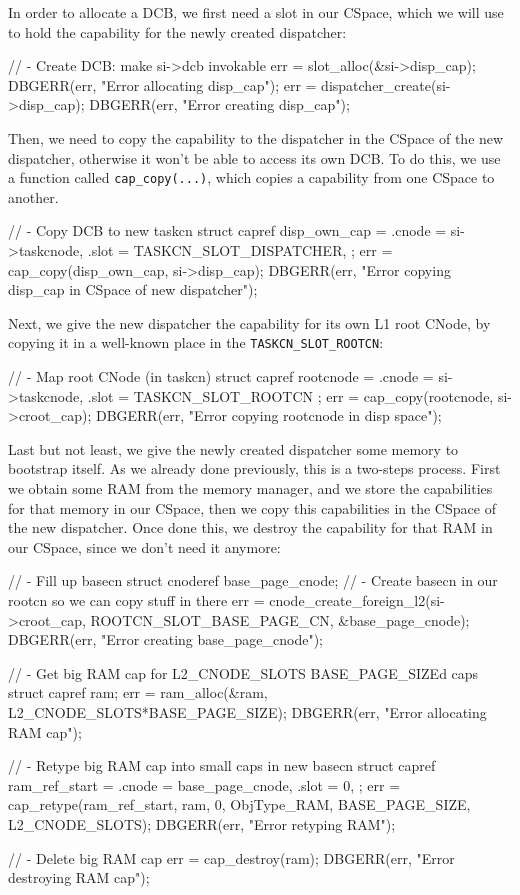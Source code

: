 \documentclass[a4paper,twoside,openright]{report}
\begin{document}
In order to allocate a DCB, we first need a slot in our CSpace, which we will use to hold the capability for the newly created dispatcher:
\begin{pandacode}
    // - Create DCB: make si->dcb invokable
    err = slot_alloc(&si->disp_cap);
    DBGERR(err, "Error allocating disp_cap\n");
    err = dispatcher_create(si->disp_cap);
    DBGERR(err, "Error creating disp_cap\n");
\end{pandacode} 

Then, we need to copy the capability to the dispatcher in the CSpace of the new dispatcher, otherwise it won't be able to access its own DCB.
To do this, we use a function called \texttt{cap\_copy(...)}, which copies a capability from one CSpace to another.
\begin{pandacode}
    // - Copy DCB to new taskcn
    struct capref disp_own_cap = {
        .cnode = si->taskcnode,
        .slot  = TASKCN_SLOT_DISPATCHER,
    };
    err = cap_copy(disp_own_cap, si->disp_cap);
    DBGERR(err, "Error copying disp_cap in CSpace of new dispatcher\n");
\end{pandacode} 

Next, we give the new dispatcher the capability for its own L1 root CNode, by copying it in a well-known place in the \texttt{TASKCN\_SLOT\_ROOTCN}:
\begin{pandacode}
    // - Map root CNode (in taskcn)
    struct capref rootcnode = {
        .cnode = si->taskcnode,
        .slot  = TASKCN_SLOT_ROOTCN
    };
    err = cap_copy(rootcnode, si->croot_cap);
    DBGERR(err, "Error copying rootcnode in disp space\n");
\end{pandacode}

Last but not least, we give the newly created dispatcher some memory to bootstrap itself.
As we already done previously, this is a two-steps process.
First we obtain some RAM from the memory manager, and we store the capabilities for that memory in our CSpace, then we copy this capabilities in the CSpace of the new dispatcher.
Once done this, we destroy the capability for that RAM in our CSpace, since we don't need it anymore:
\begin{pandacode}
    // - Fill up basecn
    struct cnoderef base_page_cnode;
    // - Create basecn in our rootcn so we can copy stuff in there
    err = cnode_create_foreign_l2(si->croot_cap, ROOTCN_SLOT_BASE_PAGE_CN, &base_page_cnode);
    DBGERR(err, "Error creating base_page_cnode\n");

    // - Get big RAM cap for L2_CNODE_SLOTS BASE_PAGE_SIZEd caps
    struct capref ram;
    err = ram_alloc(&ram, L2_CNODE_SLOTS*BASE_PAGE_SIZE);
    DBGERR(err, "Error allocating RAM cap\n");

    // - Retype big RAM cap into small caps in new basecn
    struct capref ram_ref_start = {
        .cnode = base_page_cnode,
        .slot = 0,
    };
    err = cap_retype(ram_ref_start, ram, 0, ObjType_RAM, BASE_PAGE_SIZE, L2_CNODE_SLOTS);
    DBGERR(err, "Error retyping RAM\n");

    // - Delete big RAM cap
    err = cap_destroy(ram);
    DBGERR(err, "Error destroying RAM cap\n");
\end{pandacode}
\end{document}
